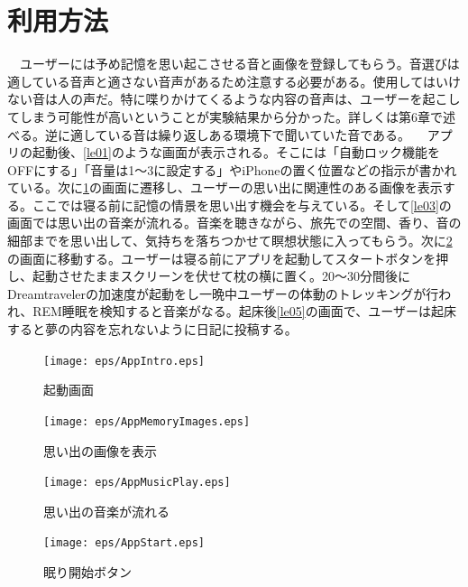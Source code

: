\section{利用方法}
　ユーザーには予め記憶を思い起こさせる音と画像を登録してもらう。音選びは適している音声と適さない音声があるため注意する必要がある。使用してはいけない音は人の声だ。特に喋りかけてくるような内容の音声は、ユーザーを起こしてしまう可能性が高いということが実験結果から分かった。詳しくは第6章で述べる。逆に適している音は繰り返しある環境下で聞いていた音である。
　アプリの起動後、\ref{le01}のような画面が表示される。そこには「自動ロック機能をOFFにする」「音量は1〜3に設定する」やiPhoneの置く位置などの指示が書かれている。次に\ref{le02}の画面に遷移し、ユーザーの思い出に関連性のある画像を表示する。ここでは寝る前に記憶の情景を思い出す機会を与えている。そして\ref{le03}の画面では思い出の音楽が流れる。音楽を聴きながら、旅先での空間、香り、音の細部までを思い出して、気持ちを落ちつかせて瞑想状態に入ってもらう。次に\ref{le04}の画面に移動する。ユーザーは寝る前にアプリを起動してスタートボタンを押し、起動させたままスクリーンを伏せて枕の横に置く。20〜30分間後にDreamtravelerの加速度が起動をし一晩中ユーザーの体動のトレッキングが行われ、REM睡眠を検知すると音楽がなる。起床後\ref{le05}の画面で、ユーザーは起床すると夢の内容を忘れないように日記に投稿する。

\begin{figure}[htbp]
 \begin{minipage}{0.45\hsize}
  \begin{center}
   \texttt{[image: eps/AppIntro.eps]}
  \end{center}
  \caption{起動画面}
  \label{le01}
 \end{minipage}
 \begin{minipage}{0.45\hsize}
  \begin{center}
   \texttt{[image: eps/AppMemoryImages.eps]}
  \end{center}
  \caption{思い出の画像を表示}
  \label{le02}
 \end{minipage}
\end{figure}

\begin{figure}[htbp]
 \begin{minipage}{0.45\hsize}
  \begin{center}
   \texttt{[image: eps/AppMusicPlay.eps]}
  \end{center}
  \caption{思い出の音楽が流れる}
  \label{le03}
 \end{minipage}
 \begin{minipage}{0.45\hsize}
  \begin{center}
   \texttt{[image: eps/AppStart.eps]}
  \end{center}
  \caption{眠り開始ボタン}
  \label{le04}
 \end{minipage}
\end{figure}


